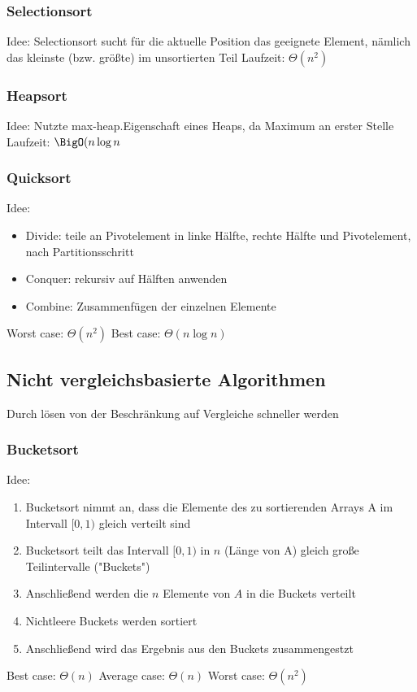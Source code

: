 \documentclass[a4paper]{article}
\begin{document}
	\subsubsection{Selectionsort}
	Idee: Selectionsort sucht für die aktuelle Position das geeignete Element, nämlich  das kleinste (bzw. größte) im unsortierten Teil \newline \newline
	Laufzeit: $\Theta(n^2)$
	\subsubsection{Heapsort}
	Idee: Nutzte max-heap.Eigenschaft eines Heaps, da Maximum an erster Stelle \newline \newline
	Laufzeit: $\BigO(n\log n$ 
	\subsubsection{Quicksort}
	Idee: 
	\begin{itemize}
	  \item Divide: teile an Pivotelement in linke Hälfte, rechte Hälfte und Pivotelement, nach Partitionsschritt
	  \item Conquer: rekursiv auf Hälften anwenden
	  \item Combine: Zusammenfügen der einzelnen Elemente
	\end{itemize}
	Worst case: $\Theta(n^2)$ \newline
	Best case: $\Theta(n\log n)$
	\subsection{Nicht vergleichsbasierte Algorithmen}
	Durch lösen von der Beschränkung auf Vergleiche schneller werden
	\subsubsection{Bucketsort}
	Idee: 
	\begin{enumerate}
	  \item Bucketsort nimmt an, dass die Elemente des zu sortierenden Arrays A im Intervall $[0,1)$ gleich verteilt sind
	  \item Bucketsort teilt das Intervall $[0,1)$ in $n$ (Länge von A) gleich große Teilintervalle ("Buckets")
	  \item Anschließend werden die $n$ Elemente von $A$ in die Buckets verteilt
	  \item Nichtleere Buckets werden sortiert
	  \item Anschließend wird das Ergebnis aus den Buckets zusammengestzt
	\end{enumerate}
	Best case: $\Theta(n)$ \newline
	Average case: $\Theta(n)$ \newline
	Worst case: $\Theta(n^2)$
\end{document}
